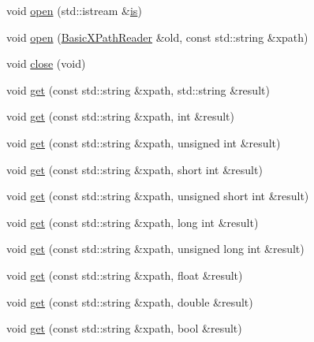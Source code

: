 \begin{DoxyCompactItemize}
void \mbox{\hyperlink{classXMLXPathReader_1_1BasicXPathReader_a48dbc690810bf8649486892c9385dbe6}{open}} (std\+::istream \&\mbox{\hyperlink{x_8cc_a81abbbdef81e25584a2eab888e643d3d}{is}})
\item 
void \mbox{\hyperlink{classXMLXPathReader_1_1BasicXPathReader_ae01eda40079a5afeee9bbdf23b316a61}{open}} (\mbox{\hyperlink{classXMLXPathReader_1_1BasicXPathReader}{Basic\+X\+Path\+Reader}} \&old, const std\+::string \&xpath)
\item 
void \mbox{\hyperlink{classXMLXPathReader_1_1BasicXPathReader_acab41ee6353e8d7289d9c28828f9ceb6}{close}} (void)
\item 
void \mbox{\hyperlink{classXMLXPathReader_1_1BasicXPathReader_a3498d5a0bf7d47094e2d8f7d81e629af}{get}} (const std\+::string \&xpath, std\+::string \&result)
\item 
void \mbox{\hyperlink{classXMLXPathReader_1_1BasicXPathReader_adffe50d2d1617b1a1769e6df0e64b33f}{get}} (const std\+::string \&xpath, int \&result)
\item 
void \mbox{\hyperlink{classXMLXPathReader_1_1BasicXPathReader_a9af23697d080af9b12c4aa3f85349646}{get}} (const std\+::string \&xpath, unsigned int \&result)
\item 
void \mbox{\hyperlink{classXMLXPathReader_1_1BasicXPathReader_a1c7190f83ff84ffa9693a34d59209347}{get}} (const std\+::string \&xpath, short int \&result)
\item 
void \mbox{\hyperlink{classXMLXPathReader_1_1BasicXPathReader_ac41b025610dc647d7cd6bbad47b08da2}{get}} (const std\+::string \&xpath, unsigned short int \&result)
\item 
void \mbox{\hyperlink{classXMLXPathReader_1_1BasicXPathReader_a59f6dda508a46d6df29478782ff22a10}{get}} (const std\+::string \&xpath, long int \&result)
\item 
void \mbox{\hyperlink{classXMLXPathReader_1_1BasicXPathReader_a3ab8225861b822d1018da05ead0f7533}{get}} (const std\+::string \&xpath, unsigned long int \&result)
\item 
void \mbox{\hyperlink{classXMLXPathReader_1_1BasicXPathReader_ac56f127ddd0e7b5919fe8f2027cb6ada}{get}} (const std\+::string \&xpath, float \&result)
\item 
void \mbox{\hyperlink{classXMLXPathReader_1_1BasicXPathReader_a5ce86f38b945414d91f609a2fdca04b2}{get}} (const std\+::string \&xpath, double \&result)
\item 
void \mbox{\hyperlink{classXMLXPathReader_1_1BasicXPathReader_aab6419964a5b28ab22299d389b9d3b7b}{get}} (const std\+::string \&xpath, bool \&result)

\end{DoxyCompactItemize}
